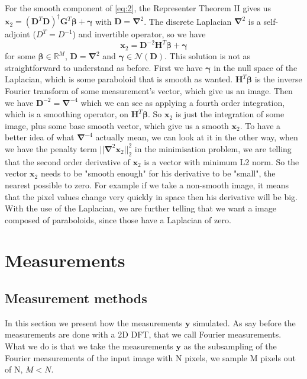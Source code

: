 \documentclass[a4paper,11pt,oneside]{report}
\theoremstyle{named}
\begin{document}
For the smooth component of \ref{eq:2}, the Representer Theorem II gives us $\boldsymbol{x}_2 = (\boldsymbol{D}^T\boldsymbol{D})^\dagger \boldsymbol{G}^T \boldsymbol{\beta} + \boldsymbol{\gamma}$ with $\boldsymbol{D} = \boldsymbol{\nabla}^2$. The discrete Laplacian $\boldsymbol{\nabla}^2$ is a self-adjoint ($D^T = D^{-1}$) and invertible operator, so we have
\begin{equation} \label{x2}
    \boldsymbol{x}_2 = \boldsymbol{D}^{-2} \boldsymbol{H}^T \boldsymbol{\beta} + \boldsymbol{\gamma}
\end{equation}
for some $\boldsymbol{\beta} \in \mathbb{R}^M$, $\boldsymbol{D} = \boldsymbol{\nabla}^2$ and $\boldsymbol{\gamma} \in \mathcal{N}(\boldsymbol{D})$. This solution is not as straightforward to understand as before. First we have $\boldsymbol{\gamma}$ in the null space of the Laplacian, which is some paraboloid that is smooth as wanted. $\boldsymbol{H}^T \boldsymbol{\beta}$ is the inverse Fourier transform of some measurement's vector, which give us an image. Then we have $\boldsymbol{D} ^{-2} = \boldsymbol{\nabla}^{-4}$ which we can see as applying a fourth order integration, which is a smoothing operator, on $\boldsymbol{H}^T \boldsymbol{\beta}$. So $\boldsymbol{x}_2$ is just the integration of some image, plus some base smooth vector, which give us a smooth $\boldsymbol{x}_2$. To have a better idea of what $\boldsymbol{\nabla}^{-4}$ actually mean, we can look at it in the other way, when we have the penalty term $||\boldsymbol{\nabla}^2 \boldsymbol{x}_2||_2^2$ in the minimisation problem, we are telling that the second order derivative of $\boldsymbol{x}_2$ is a vector with minimum L2 norm. So the vector $\boldsymbol{x}_2$ needs to be "smooth enough" for his derivative to be "small", the nearest possible to zero. For example if we take a non-smooth image, it means that the pixel values change very quickly in space then his derivative will be big. With the use of the Laplacian, we are further telling that we want a image composed of paraboloids, since those have a Laplacian of zero.

\section{Measurements}

\subsection{Measurement methods} \label{methods}
In this section we present how the measurements $\boldsymbol{y}$ simulated. As say before the measurements are done with a 2D DFT, that we call Fourier measurements. What we do is that we take the measurements $\boldsymbol{y}$ as the subsampling of the Fourier measurements of the input image with N pixels, we sample M pixels out of N, $M < N$. 
\end{document}
